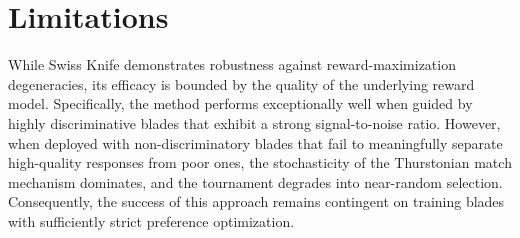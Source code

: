 \documentclass[letterpaper]{article} %
\begin{document}
\section{Limitations}
While Swiss Knife demonstrates robustness against reward-maximization degeneracies, its efficacy is bounded by the quality of the underlying reward model. Specifically, the method performs exceptionally well when guided by highly discriminative blades that exhibit a strong signal-to-noise ratio. However, when deployed with non-discriminatory blades that fail to meaningfully separate high-quality responses from poor ones, the stochasticity of the Thurstonian match mechanism dominates, and the tournament degrades into near-random selection. Consequently, the success of this approach remains contingent on training blades with sufficiently strict preference optimization.


% 
\end{document}
